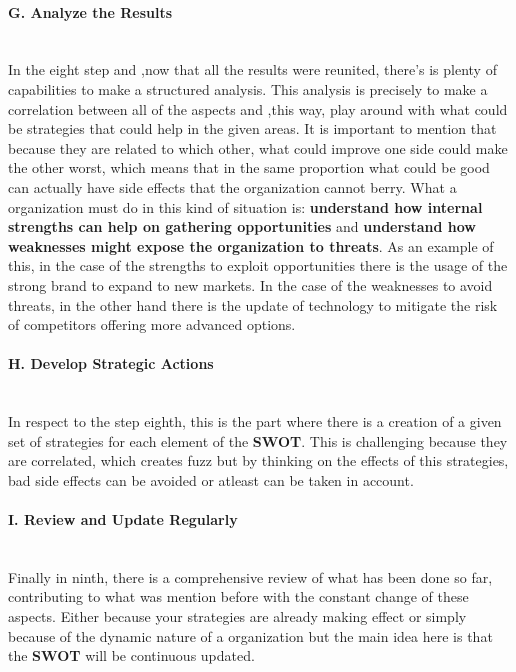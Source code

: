 \paragraph{G. Analyze the Results}\mbox{}\\
In the eight step and ,now that all the results were reunited, there's is plenty of capabilities to make a structured analysis. This analysis is precisely to make a correlation between all of the aspects and ,this way, play around with what could be strategies that could help in the given areas. It is important to mention that because they are related to which other, what could improve one side could make the other worst, which means that in the same proportion what could be good can actually have side effects that the organization cannot berry. 
What a organization must do in this kind of situation is: \textbf{understand how internal strengths can help on gathering opportunities} and \textbf{understand how weaknesses might expose the organization to threats}. As an example of this, in the case of the strengths to exploit opportunities there is the usage of the strong brand to expand to new markets. In the case of the weaknesses to avoid threats, in the other hand there is the update of technology to mitigate the risk of competitors offering more advanced options.

\paragraph{H. Develop Strategic Actions}\mbox{}\\
In respect to the step eighth, this is the part where there is a creation of a given set of strategies for each element of the \textbf{SWOT}. This is challenging because they are correlated, which creates fuzz but by thinking on the effects of this strategies, bad side effects can be avoided or atleast can be taken in account.

\paragraph{I. Review and Update Regularly}\mbox{}\\
Finally in ninth, there is a comprehensive review of what has been done so far, contributing to what was mention before with the constant change of these aspects. Either because your strategies are already making effect or simply because of the dynamic nature of a organization but the main idea here is that the \textbf{SWOT} will be continuous updated.

